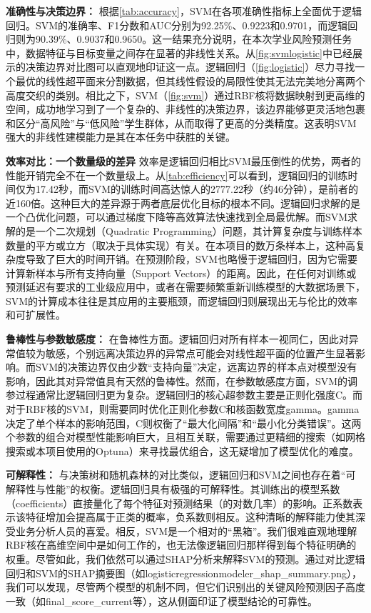 \documentclass{SYSUReport}
\begin{document}
\textbf{准确性与决策边界：}
根据\ref{tab:accuracy}，SVM在各项准确性指标上全面优于逻辑回归。SVM的准确率、F1分数和AUC分别为92.25\%、0.9223和0.9701，而逻辑回归则为90.39\%、0.9037和0.9650。这一结果充分说明，在本次学业风险预测任务中，数据特征与目标变量之间存在显著的非线性关系。从\ref{fig:svmlogistic}中已经展示的决策边界对比图可以直观地印证这一点。逻辑回归（\ref{fig:logistic}）尽力寻找一个最优的线性超平面来分割数据，但其线性假设的局限性使其无法完美地分离两个高度交织的类别。相比之下，SVM（\ref{fig:svm}）通过RBF核将数据映射到更高维的空间，成功地学习到了一个复杂的、非线性的决策边界，该边界能够更灵活地包裹和区分“高风险”与“低风险”学生群体，从而取得了更高的分类精度。这表明SVM强大的非线性建模能力是其在本任务中获胜的关键。

\textbf{效率对比：一个数量级的差异}
效率是逻辑回归相比SVM最压倒性的优势，两者的性能开销完全不在一个数量级上。从\ref{tab:efficiency}可以看到，逻辑回归的训练时间仅为17.42秒，而SVM的训练时间高达惊人的2777.22秒（约46分钟），是前者的近160倍。这种巨大的差异源于两者底层优化目标的根本不同。逻辑回归求解的是一个凸优化问题，可以通过梯度下降等高效算法快速找到全局最优解。而SVM求解的是一个二次规划（Quadratic Programming）问题，其计算复杂度与训练样本数量的平方或立方（取决于具体实现）有关。在本项目的数万条样本上，这种高复杂度导致了巨大的时间开销。在预测阶段，SVM也略慢于逻辑回归，因为它需要计算新样本与所有支持向量（Support Vectors）的距离。因此，在任何对训练或预测延迟有要求的工业级应用中，或者在需要频繁重新训练模型的大数据场景下，SVM的计算成本往往是其应用的主要瓶颈，而逻辑回归则展现出无与伦比的效率和可扩展性。

\textbf{鲁棒性与参数敏感度：}
在鲁棒性方面。逻辑回归对所有样本一视同仁，因此对异常值较为敏感，个别远离决策边界的异常点可能会对线性超平面的位置产生显著影响。而SVM的决策边界仅由少数“支持向量”决定，远离边界的样本点对模型没有影响，因此其对异常值具有天然的鲁棒性。然而，在参数敏感度方面，SVM的调参过程通常比逻辑回归更为复杂。逻辑回归的核心超参数主要是正则化强度C。而对于RBF核的SVM，则需要同时优化正则化参数C和核函数宽度gamma。gamma决定了单个样本的影响范围，C则权衡了“最大化间隔”和“最小化分类错误”。这两个参数的组合对模型性能影响巨大，且相互关联，需要通过更精细的搜索（如网格搜索或本项目使用的Optuna）来寻找最优组合，这无疑增加了模型优化的难度。

\textbf{可解释性：}
与决策树和随机森林的对比类似，逻辑回归和SVM之间也存在着“可解释性与性能”的权衡。逻辑回归具有极强的可解释性。其训练出的模型系数（coefficients）直接量化了每个特征对预测结果（的对数几率）的影响。正系数表示该特征增加会提高属于正类的概率，负系数则相反。这种清晰的解释能力使其深受业务分析人员的喜爱。相反，SVM是一个相对的“黑箱”。我们很难直观地理解RBF核在高维空间中是如何工作的，也无法像逻辑回归那样得到每个特征明确的权重。尽管如此，我们依然可以通过SHAP分析来解释SVM的预测。通过对比逻辑回归和SVM的SHAP摘要图（如logisticregressionmodeler\_shap\_summary.png），我们可以发现，尽管两个模型的机制不同，但它们识别出的关键风险预测因子高度一致（如final\_score\_current等），这从侧面印证了模型结论的可靠性。
\end{document}
